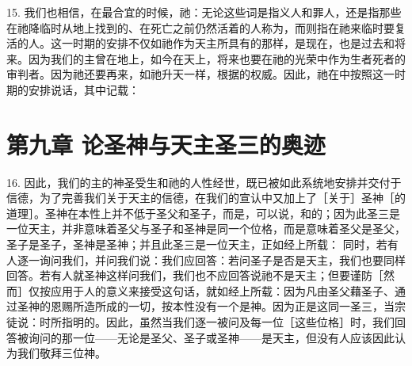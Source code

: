 15. 我们也相信，在最合宜的时候，祂：无论这些词是指义人和罪人，还是指那些在祂降临时从地上找到的、在死亡之前仍然活着的人称为，而则指在祂来临时要复活的人。这一时期的安排不仅如祂作为天主所具有的那样，是现在，也是过去和将来。因为我们的主曾在地上，如今在天上，将来也要在祂的光荣中作为生者死者的审判者。因为祂还要再来，如祂升天一样，根据的权威。因此，祂在中按照这一时期的安排说话，其中记载：\par


\section{第九章 论圣神与天主圣三的奥迹}

16. 因此，我们的主的神圣受生和祂的人性经世，既已被如此系统地安排并交付于信德，为了完善我们关于天主的信德，在我们的宣认中又加上了［关于］圣神［的道理］。圣神在本性上并不低于圣父和圣子，而是，可以说，和的；因为此圣三是一位天主，并非意味着圣父与圣子和圣神是同一个位格，而是意味着圣父是圣父，圣子是圣子，圣神是圣神；并且此圣三是一位天主，正如经上所载： 同时，若有人逐一询问我们，并问我们说：我们应回答：若问圣子是否是天主，我们也要同样回答。若有人就圣神这样问我们，我们也不应回答说祂不是天主；但要谨防［然而］仅按应用于人的意义来接受这句话，就如经上所载：因为凡由圣父藉圣子、通过圣神的恩赐所造所成的一切，按本性没有一个是神。因为正是这同一圣三，当宗徒说：时所指明的。因此，虽然当我们逐一被问及每一位［这些位格］时，我们回答被询问的那一位——无论是圣父、圣子或圣神——是天主，但没有人应该因此认为我们敬拜三位神。\par


